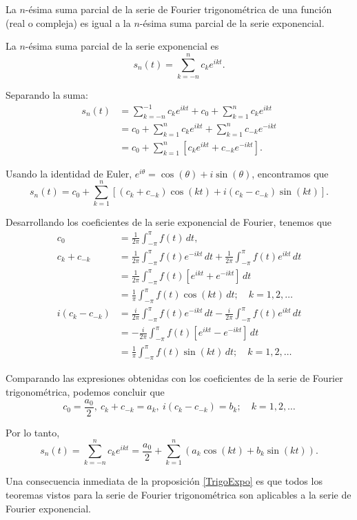 
\begin{propo} \label{TrigoExpo}
La $n$-ésima suma parcial de la serie de Fourier trigonométrica de una función (real o compleja) es igual a la $n$-ésima suma parcial de la serie exponencial.
\end{propo}

\begin{demo}
La $n$-ésima suma parcial de la serie exponencial es
$$ s_n(t) = \sum_{k=-n}^n c_k e^{ikt}.$$

Separando la suma:
\begin{align*}
    s_n(t) &= \sum_{k=-n}^{-1} c_k e^{ikt} + c_0 + \sum_{k=1}^n c_k e^{ikt} \\
    &= c_0 + \sum_{k=1}^n c_k e^{ikt} + \sum_{k=1}^n c_{-k} e^{-ikt} \\
    &= c_0 + \sum_{k=1}^n [c_k e^{ikt} + c_{-k} e^{-ikt}]. 
\end{align*}

Usando la identidad de Euler, $e^{i\theta} = \cos(\theta) + i \sin(\theta)$, encontramos que
$$s_n(t) = c_0 +  \sum_{k=1}^n [(c_k + c_{-k}) \cos(kt) + i(c_k - c_{-k}) \sin(kt)].$$

Desarrollando los coeficientes de la serie exponencial de Fourier, tenemos que
\begingroup
\allowdisplaybreaks
\begin{align*}
    c_0 &= \frac{1}{2\pi} \int_{-\pi}^{\pi} f(t) \,dt, \\
    c_k + c_{-k} &= \frac{1}{2\pi} \int_{-\pi}^{\pi} f(t) e^{-ikt} \,dt + \frac{1}{2\pi} \int_{-\pi}^{\pi} f(t) e^{ikt} \,dt  \\
    &= \frac{1}{2\pi} \int_{-\pi}^{\pi} f(t) [e^{ikt} + e^{-ikt}] \,dt \\
    &= \frac{1}{\pi} \int_{-\pi}^{\pi} f(t) \cos(kt) \,dt; \quad k = 1,2, \dots\\
   i( c_k - c_{-k}) &= \frac{i}{2\pi} \int_{-\pi}^{\pi} f(t) e^{-ikt} \,dt - \frac{i}{2\pi} \int_{-\pi}^{\pi} f(t) e^{ikt} \,dt \\
   &= - \frac{i}{2\pi} \int_{-\pi}^{\pi} f(t) [e^{ikt} - e^{-ikt}] \,dt \\
   &= \frac{1}{\pi} \int_{-\pi}^{\pi} f(t) \sin(kt)\,dt; \quad k = 1,2, \dots
\end{align*}
\endgroup

Comparando las expresiones obtenidas con los coeficientes de la serie de Fourier trigonométrica, podemos concluir que 
$$c_0 = \frac{a_0}{2}, ~  c_k + c_{-k} = a_k, ~ i( c_k - c_{-k}) = b_k; \quad k = 1,2, \dots$$

Por lo tanto, 
$$ s_n(t) = \sum_{k=-n}^n c_k e^{ikt} = \frac{a_0}{2} + \sum_{k=1}^n (a_k \cos(kt) + b_k \sin(kt)).$$

\end{demo}
Una consecuencia inmediata de la proposición \ref{TrigoExpo} es que todos los teoremas vistos para la serie de Fourier trigonométrica son aplicables a la serie de Fourier exponencial.

